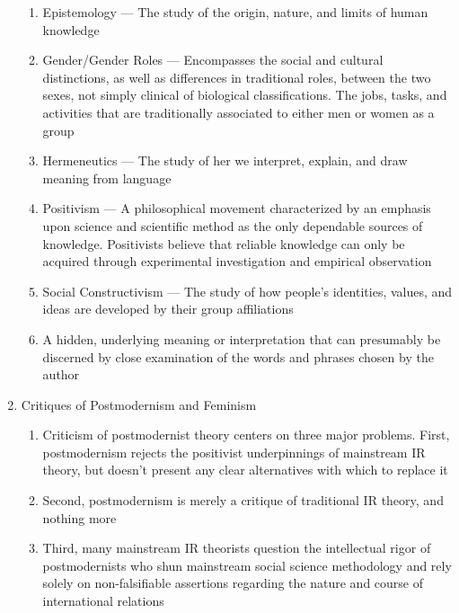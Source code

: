 \documentclass[12pt]{article}
\begin{document}
\begin{enumerate}
\begin{enumerate}
          \item Epistemology — The study of the origin, nature, and limits of human knowledge

          \item Gender/Gender Roles — Encompasses the social and cultural distinctions, as well as differences in traditional roles, between the two sexes, not simply clinical of biological classifications. The jobs, tasks, and activities that are traditionally associated to either men or women as a group

          \item Hermeneutics — The study of her we interpret, explain, and draw meaning from language

          \item Positivism — A philosophical movement characterized by an emphasis upon science and scientific method as the only dependable sources of knowledge. Positivists believe that reliable knowledge can only be acquired through experimental investigation and empirical observation

          \item Social Constructivism — The study of how people's identities, values, and ideas are developed by their group affiliations

          \item A hidden, underlying meaning or interpretation that can presumably be discerned by close examination of the words and phrases chosen by the author

        \end{enumerate}

      \item Critiques of Postmodernism and Feminism

        \begin{enumerate}

          \item Criticism of postmodernist theory centers on three major problems. First, postmodernism rejects the positivist underpinnings of mainstream IR theory, but doesn't present any clear alternatives with which to replace it

          \item Second, postmodernism is merely a critique of traditional IR theory, and nothing more

          \item Third, many mainstream IR theorists question the intellectual rigor of postmodernists who shun mainstream social science methodology and rely solely on non-falsifiable assertions regarding the nature and course of international relations


\end{enumerate}
\end{enumerate}
\end{document}
